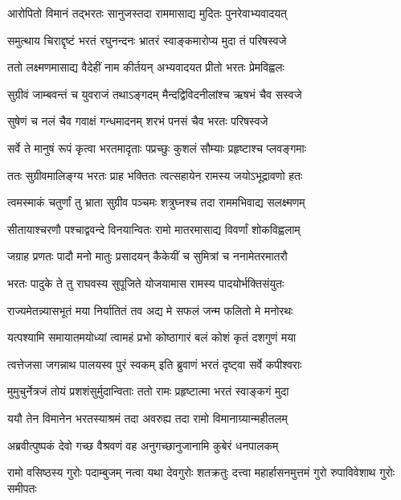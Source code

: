 \twolineshloka
{आरोपितो विमानं तद्भरतः सानुजस्तदा}
{राममासाद्य मुदितः पुनरेवाभ्यवादयत्} %

\twolineshloka
{समुत्थाय चिराद्दृष्टं भरतं रघुनन्दनः}
{भ्रातरं स्वाङ्कमारोप्य मुदा तं परिषस्वजे} %

\twolineshloka
{ततो लक्ष्मणमासाद्य वैदेहीं नाम कीर्तयन्}
{अभ्यवादयत प्रीतो भरतः प्रेमविह्वलः} %

\twolineshloka
{सुग्रीवं जाम्बवन्तं च युवराजं तथाऽङ्गदम्}
{मैन्दद्विविदनीलांश्च ऋषभं चैव सस्वजे} %

\twolineshloka
{सुषेणं च नलं चैव गवाक्षं गन्धमादनम्}
{शरभं पनसं चैव भरतः परिषस्वजे} %

\twolineshloka
{सर्वे ते मानुषं रूपं कृत्वा भरतमादृताः}
{पप्रच्छुः कुशलं सौम्याः प्रहृष्टाश्च प्लवङ्गमाः} %

\twolineshloka
{ततः सुग्रीवमालिङ्ग्य भरतः प्राह भक्तितः}
{त्वत्सहायेन रामस्य जयोऽभूद्रावणो हतः} %

\twolineshloka
{त्वमस्माकं चतुर्णां तु भ्राता सुग्रीव पञ्चमः}
{शत्रुघ्नश्च तदा राममभिवाद्य सलक्ष्मणम्} %

\twolineshloka
{सीतायाश्चरणौ पश्चाद्ववन्दे विनयान्वितः}
{रामो मातरमासाद्य विवर्णां शोकविह्वलाम्} %

\twolineshloka
{जग्राह प्रणतः पादौ मनो मातुः प्रसादयन्}
{कैकेयीं च सुमित्रां च ननामेतरमातरौ} %

\twolineshloka
{भरतः पादुके ते तु राघवस्य सुपूजिते}
{योजयामास रामस्य पादयोर्भक्तिसंयुतः} %

\twolineshloka
{राज्यमेतन्न्यासभूतं मया निर्यातितं तव}
{अद्य मे सफलं जन्म फलितो मे मनोरथः} %

\twolineshloka
{यत्पश्यामि समायातमयोध्यां त्वामहं प्रभो}
{कोष्ठागारं बलं कोशं कृतं दशगुणं मया} %

\twolineshloka
{त्वत्तेजसा जगन्नाथ पालयस्व पुरं स्वकम्}
{इति ब्रुवाणं भरतं दृष्ट्वा सर्वे कपीश्वराः} %

\twolineshloka
{मुमुचुर्नेत्रजं तोयं प्रशशंसुर्मुदान्विताः}
{ततो रामः प्रहृष्टात्मा भरतं स्वाङ्कगं मुदा} %

\twolineshloka
{ययौ तेन विमानेन भरतस्याश्रमं तदा}
{अवरुह्य तदा रामो विमानाग्र्यान्महीतलम्} %

\twolineshloka
{अब्रवीत्पुष्पकं देवो गच्छ वैश्रवणं वह}
{अनुगच्छानुजानामि कुबेरं धनपालकम्} %

\fourlineindentedshloka
{रामो वसिष्ठस्य गुरोः पदाम्बुजम्}
{नत्वा यथा देवगुरोः शतक्रतुः}
{दत्त्वा महार्हासनमुत्तमं गुरो\-}
{रुपाविवेशाथ गुरोः समीपतः} %


